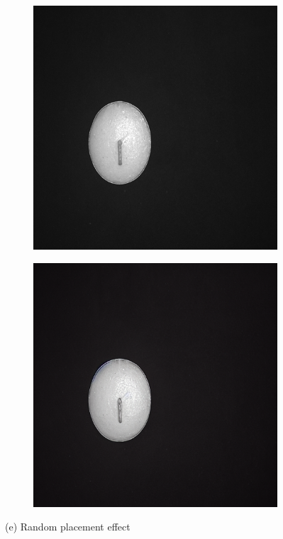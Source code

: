 \documentclass[12pt,DIV14,BCOR12mm,a4paper,footinclude=false,headinclude,parskip=half-,twoside,openright,cleardoublepage=empty,toc=index,bibliography=totoc,listof=totoc]{scrreprt}
\numberwithin{equation}{chapter}
\begin{document}
\begin{figure}
    \vspace{0.3cm} %

    \begin{subfigure}[t]{0.45\textwidth}
        \centering
        \includegraphics[width=\textwidth]{../media/diff_candles_random_real.png}
    \end{subfigure}%
    \hspace{0.02\textwidth}%
    \begin{subfigure}[t]{0.45\textwidth}
        \centering
        \includegraphics[width=\textwidth]{../media/diff_candles_random_fake.png}
    \end{subfigure}
    \caption*{(e) Random placement effect}


\end{figure}
\end{document}
